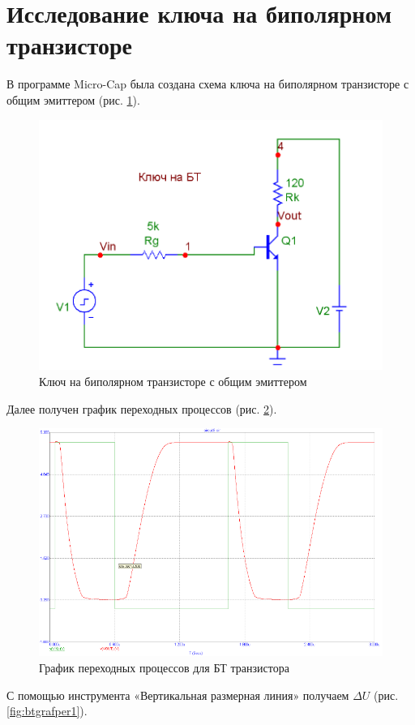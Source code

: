 \documentclass[a4paper,14pt]{article}
\begin{document}

\pagebreak
\section{Исследование ключа на биполярном транзисторе}

В программе Micro-Cap была создана схема ключа на биполярном транзисторе с общим эмиттером (рис. \ref{fig:btsh}).

\begin{figure}[H]
	\centering
	\includegraphics[width=0.7\linewidth]{image/BT_sh}
	\caption{Ключ на биполярном транзисторе с общим эмиттером}
	\label{fig:btsh}
\end{figure}

Далее получен график переходных процессов (рис. \ref{fig:btgrafper}).

\begin{figure}[H]
	\centering
	\includegraphics[width=0.7\linewidth]{image/BT_graf_per}
	\caption{График переходных процессов для БТ транзистора}
	\label{fig:btgrafper}
\end{figure}

С помощью инструмента «Вертикальная размерная линия» получаем $\Delta U$ (рис. \ref{fig:btgrafper1}).
\end{document}

